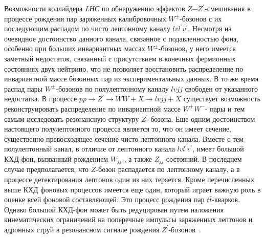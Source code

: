 Возможности коллайдера \textit{LНС} по обнаружению эффектов $Z$−$Z^\prime$-смешивания в процессе рождения пар заряженных калибровочных $W^±$-бозонов с их последующим распадом по чисто лептонному каналу $lvl^\prime v^\prime$. Несмотря на очевидное достоинство данного канала, связанное с подавленностью фона, особенно при больших инвариантных массах $W^±$-бозонов, у него имеется заметный недостаток, связанный с присутствием в конечных фермионных состояниях двух нейтрино, что не позволяет восстановить распределение по инвариантной массе бозонных пар из экспериментальных данных. В то же время распад пары $W^±$-бозонов по полулептонному каналу $lvjj$ свободен от указанного недостатка. В процессе $pp \rightarrow Z^\prime \rightarrow WW + X \rightarrow lvjj + X$ существует возможность реконструировать распределение по инвариантной массе $W^+W^-$- пары и тем самым исследовать резонансную структуру $Z^\prime$-бозона. Еще одним достоинством настоящего полулептонного процесса является то, что он имеет сечение, существенно превосходящее сечение чисто лептонного канала. Вместе с тем полулептонный канал, в отличие от лептонного канала $lvl^\prime v^\prime$, имеет большой КХД-фон, вызванный рождением $W_{jj}$-, а также $Z_{jj}$-состояний. В последнем случае предполагается, что $Z$-бозон распадается по лептонному каналу, а в процессе детектирования лептонов один из них теряется. Кроме перечисленных выше КХД фоновых процессов имеется еще один, который играет важную роль в оценке всей фоновой составляющей. Это процесс рождения пар $t\bar{t}$-кварков. Однако большой КХД-фон может быть редуцирован путем наложения кинематических ограничений на поперечные импульсы заряженных лептонов и адронных струй в резонансном сигнале рождения $Z^\prime$-бозонов~\cite{Bobovnikov:2016}.

